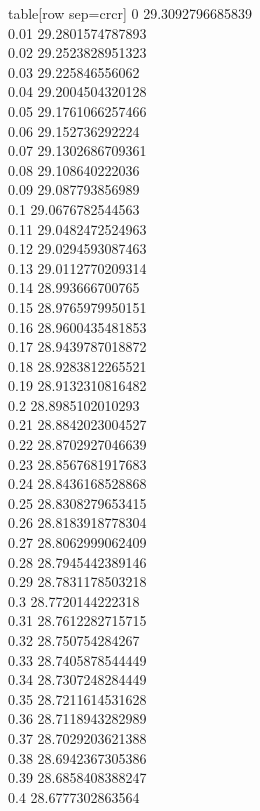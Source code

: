   table[row sep=crcr]{%
0	29.3092796685839\\
0.01	29.2801574787893\\
0.02	29.2523828951323\\
0.03	29.225846556062\\
0.04	29.2004504320128\\
0.05	29.1761066257466\\
0.06	29.152736292224\\
0.07	29.1302686709361\\
0.08	29.108640222036\\
0.09	29.087793856989\\
0.1	29.0676782544563\\
0.11	29.0482472524963\\
0.12	29.0294593087463\\
0.13	29.0112770209314\\
0.14	28.993666700765\\
0.15	28.9765979950151\\
0.16	28.9600435481853\\
0.17	28.9439787018872\\
0.18	28.9283812265521\\
0.19	28.9132310816482\\
0.2	28.8985102010293\\
0.21	28.8842023004527\\
0.22	28.8702927046639\\
0.23	28.8567681917683\\
0.24	28.8436168528868\\
0.25	28.8308279653415\\
0.26	28.8183918778304\\
0.27	28.8062999062409\\
0.28	28.7945442389146\\
0.29	28.7831178503218\\
0.3	28.7720144222318\\
0.31	28.7612282715715\\
0.32	28.750754284267\\
0.33	28.7405878544449\\
0.34	28.7307248284449\\
0.35	28.7211614531628\\
0.36	28.7118943282989\\
0.37	28.7029203621388\\
0.38	28.6942367305386\\
0.39	28.6858408388247\\
0.4	28.6777302863564\\
}
